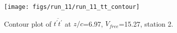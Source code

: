 \begin{figure}[H]
\centering
\texttt{[image: figs/run\_11/run\_11\_tt\_contour]}
\caption{Contour plot of $\overline{t^\prime t^\prime}$ at $z/c$=6.97, $V_{free}$=15.27, station 2.}
\label{fig:run_11_tt_contour}
\end{figure}


